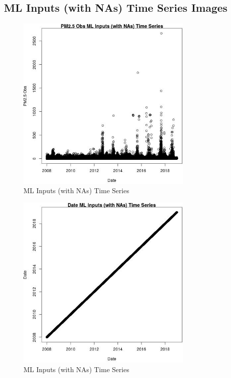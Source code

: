 
\subsection{ML Inputs (with NAs) Time Series Images} 
 

\begin{figure} 
\centering  
\includegraphics[width=0.77\textwidth]{Code_Outputs/Report_ML_input_PM25_Step4_part_e_de_duplicated_aves2008-18_noNAMwNAs_PM25_ObsvDate.jpg} 
\caption{\label{fig:Report_ML_input_PM25_Step4_part_e_de_duplicated_aves2008-18_noNAMwNAsPM25_ObsvDate}ML Inputs (with NAs) Time Series} 
\end{figure} 
 

\begin{figure} 
\centering  
\includegraphics[width=0.77\textwidth]{Code_Outputs/Report_ML_input_PM25_Step4_part_e_de_duplicated_aves2008-18_noNAMwNAs_DatevDate.jpg} 
\caption{\label{fig:Report_ML_input_PM25_Step4_part_e_de_duplicated_aves2008-18_noNAMwNAsDatevDate}ML Inputs (with NAs) Time Series} 
\end{figure} 
 

